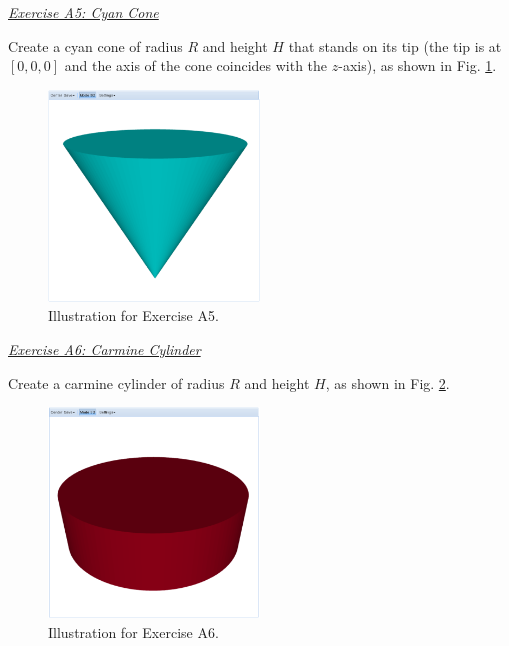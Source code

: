 \documentclass[article,A4,12pt]{llncs}
\begin{document}
\noindent
\underline{\em Exercise A5: Cyan Cone}

Create a cyan cone of radius $R$ and height $H$ that stands on its tip
(the tip is at $[0, 0, 0]$ and the axis of the cone coincides with the 
$z$-axis), as shown in Fig. \ref{fig:a5}.

\begin{figure}[!ht]
\begin{center}
\includegraphics[width=0.5\textwidth]{img/a5-cyan-cone.png}
\end{center}
\vspace{-4mm}
\caption{Illustration for Exercise A5.}
\label{fig:a5}
\vspace{-1cm}
\end{figure}

\newpage
\noindent
\underline{\em Exercise A6: Carmine Cylinder}

Create a carmine cylinder of radius $R$ and height $H$, 
as shown in Fig. \ref{fig:a6}.

\begin{figure}[!ht]
\begin{center}
\includegraphics[width=0.5\textwidth]{img/a6-carmine-cylinder.png}
\end{center}
\vspace{-2mm}
\caption{Illustration for Exercise A6.}
\label{fig:a6}
\end{figure}
\end{document}
